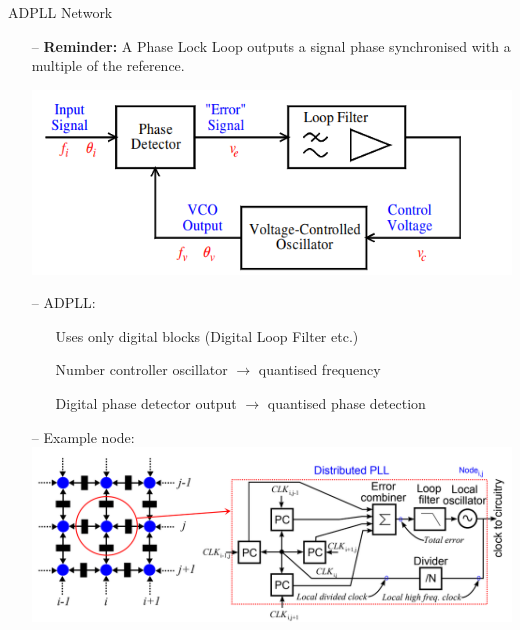\documentclass{beamer}
\begin{document}
\begin{frame}{ADPLL Network}

    \begin{itemize}
        \item[--]
            \textbf{Reminder:} A Phase Lock Loop outputs a signal phase synchronised with a multiple of the reference.
            \begin{center}
            \includegraphics[scale=0.3]{mulkeen_pll}
            \end{center}
        \item[--]
            ADPLL:
            \begin{itemize}
	        \item[]
	            Uses only digital blocks (Digital Loop Filter etc.)
	        \item[]
	           Number controller oscillator $\rightarrow$ quantised frequency
	        \item[]
	            Digital phase detector output $\rightarrow$ quantised phase detection
        	\end{itemize}
    	\item[--]
    		Example node:
			\includegraphics[scale=0.3]{eldar_node}
    \end{itemize}
\end{frame}
\end{document}
